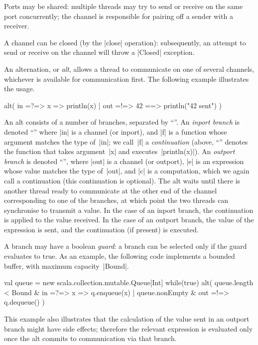 Ports may be shared: multiple threads may try to send or receive on the same
port concurrently; the channel is responsible for pairing off a sender with a
receiver. 

A channel can be closed (by the |close| operation): subsequently, an attempt
to send or receive on the channel will throw a |Closed| exception.

An alternation, or \emph{alt}, allows a thread to communicate on one of
several channels, whichever is available for communication first.  The
following example illustrates the usage.
%
\begin{scala}
alt(
  in =?=> { x => println(x) }
  | out =!=> { 42 } ==> { println("42 sent") }
)
\end{scala}
%
An alt consists of a number of branches, separated by ``\SCALA{\|}''.  An
\emph{inport branch} is denoted ``'' where |in| is a channel
(or inport), and |f| is a function whose argument matches the type of~|in|; we
call~|f| a \emph{continuation} (above, ``'' denotes the
function that takes argument~|x| and executes~|println(x)|).  An \emph{outport
  branch} is denoted ``'', where |out| is a channel
(or outport), |e| is an expression whose value matches the type of~|out|, and
|c| is a computation, which we again call a continuation (this continuation is
optional).  The alt waits until there is another thread ready to communicate
at the other end of the channel corresponding to one of the branches, at which
point the two threads can synchronise to transmit a value.  In the case of an
inport branch, the continuation is applied to the value received.  In the case
of an outport branch, the value of the expression is sent, and the
continuation (if present) is executed.

A branch may have a boolean \emph{guard}: a branch can be selected only if the
guard evaluates to true.  As an example, the following code implements a
bounded buffer, with maximum capacity~|Bound|.
%
\begin{scala}
val queue = new scala.collection.mutable.Queue[Int]
while(true){
  alt(
    queue.length < Bound & in =?=> { x => q.enqueue(x) }
    | queue.nonEmpty & out =!=> { q.dequeue() }
  )    
}
\end{scala}
%
This example also illustrates that the calculation of the value sent in an
outport branch might have side effects; therefore the relevant expression is
evaluated only once the alt commits to communication via that branch.

